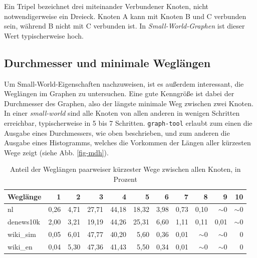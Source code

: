 \documentclass[11pt, a4paper]{article}
\begin{document}
Ein Tripel bezeichnet drei miteinander Verbundener Knoten, nicht
notwendigerweise ein Dreieck. Knoten A kann mit Knoten B und C verbunden sein,
während B nicht mit C verbunden ist. In \emph{Small-World-Graphen} ist dieser
Wert typischerweise hoch. 



\subsection{Durchmesser und minimale Wegl\"angen}
Um Small-World-Eigenschaften nachzuweisen, ist es außerdem interessant, die
Weglängen im Graphen zu untersuchen. Eine gute Kenngröße ist dabei der Durchmesser
des Graphen, also der längste minimale Weg zwischen zwei Knoten. In einer
\emph{small-world} sind alle Knoten von allen anderen in wenigen Schritten
erreichbar, typischerweise in 5 bis 7 Schritten. \texttt{graph-tool}
erlaubt zum einen die Ausgabe eines Durchmessers, wie oben beschrieben, und zum
anderen die Ausgabe eines Histogramms, welches die Vorkommen der Längen aller
kürzesten Wege zeigt (siehe Abb. \ref{fig-mdh}).

\begin{table}[h]
  \centering
  \begin{tabular}{l*{10}{r}}
    \toprule
    Weglänge    & 1    & 2    & 3     & 4     & 5     & 6    & 7    & 8        & 9        & 10      \\
    \midrule
    nl          & 0,26 & 4,71 & 27,71 & 44,18 & 18,32 & 3,98 & 0,73 & 0,10     & $\sim$0  & $\sim$0 \\
    denews10k   & 2,00 & 3,21 & 19,19 & 44,26 & 25,31 & 6,60 & 1,11 & 0,11     & 0,01     & $\sim$0 \\
    wiki\_sim   & 0,05 & 6,01 & 47,77 & 40,20 & 5,60  & 0,36 & 0,01 & $\sim$0  & $\sim$0  & 0       \\
    wiki\_en    & 0,04 & 5,30 & 47,36 & 41,43 & 5,50  & 0,34 & 0,01 & $\sim$0  & $\sim$0  & 0       \\
  \bottomrule
  \end{tabular}
  \caption{Anteil der Weglängen paarweiser kürzester Wege zwischen allen Knoten, in Prozent}
\end{table}
\end{document}
